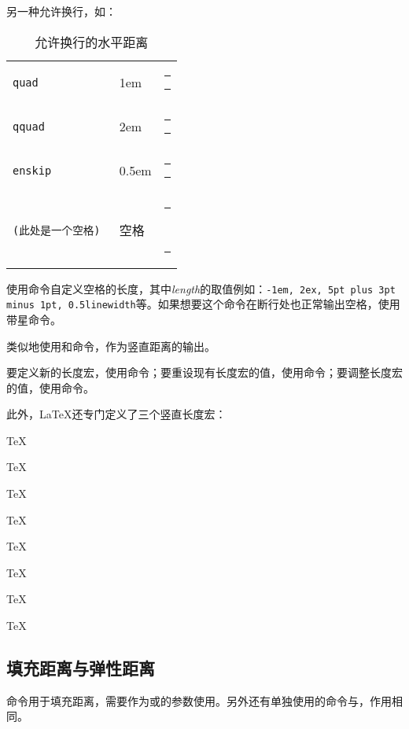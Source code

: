 另一种允许换行，如：
\begin{table}[!htb]
\centering
\caption{允许换行的水平距离}
\label{tab:break-hspace}
\begin{tabular}{>{\tt\char92}p{12em}p{8em}p{6em}}
  quad          & 1em           & \rule{8pt}{2pt}\quad\rule[4pt]{8pt}{2pt} \\
  qquad         & 2em           & \rule{8pt}{2pt}\qquad\rule[4pt]{8pt}{2pt} \\
  enskip        & 0.5em         & \rule{8pt}{2pt}\enskip\rule[4pt]{8pt}{2pt} \\
  \enspace(此处是一个空格) & 空格 & \rule{8pt}{2pt}\ \rule[4pt]{8pt}{2pt}
\end{tabular}
\end{table}

使用\latexline{\\hspace{length}}命令自定义空格的长度，其中\textit{length}的取值例如：\texttt{-1em, 2ex, 5pt plus 3pt minus 1pt, 0.5linewidth}等。如果想要这个命令在断行处也正常输出空格，使用带星命令\latexline{\\hspace*}。

类似地使用\latexline{\\vspace}和\latexline{\\vspace*}命令，作为竖直距离的输出。

要定义新的长度宏，使用\latexline{\\newlength}命令；要重设现有长度宏的值，使用\latexline{\\setlength}命令；要调整长度宏的值，使用\latexline{\\addtolength}命令。
\begin{latex}{}
\newlength{\mylatexlength}
\setlength{\mylatexlength}{10pt}
\addtolength{\mylatexlength}{-5pt}
\end{latex}

此外，\LaTeX 还专门定义了三个竖直长度宏：

\begin{codeshow}
\parbox[t]{3em}{TeX\par TeX}
\parbox[t]{3em}{TeX\par\smallskip TeX}
\parbox[t]{3em}{TeX\par\medskip TeX}
\parbox[t]{3em}{TeX\par\bigskip TeX}
\end{codeshow}

\subsection{填充距离与弹性距离}
命令\latexline{\\fill}用于填充距离，需要作为\latexline{\\hspace}或\latexline{\\vspace}的参数使用。另外还有单独使用的命令\latexline{\\hfill}与\latexline{\\vfill}，作用相同。

